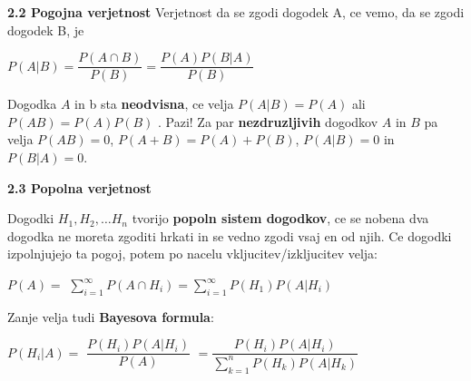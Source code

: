 \documentclass{article}
\begin{document}
\begin{multicols}{3}
\textbf{2.2 Pogojna verjetnost}
Verjetnost da se zgodi dogodek A, ce vemo, da se zgodi dogodek B, je
\begin{center}
    \begin{math}
        P(A | B) = \dfrac{P(A \cap B)}{P(B)} = \dfrac{P(A)P(B|A)}{P(B)}
    \end{math}
\end{center}
Dogodka $A$ in b sta \textbf{neodvisna}, ce velja $P(A | B) = P(A)$ ali
$P(A B) = P(A)P(B)$ .
Pazi! Za par \textbf{nezdruzljivih} dogodkov $A$ in $B$
pa velja $P(AB) = 0$,  $P(A + B) = P(A) + P(B)$, $P(A|B) = 0$ in $P(B|A) = 0$.

\textbf{2.3 Popolna verjetnost}

Dogodki $H_{1}, H_{2}, \dots H_{n}$ tvorijo \textbf{popoln sistem dogodkov},
ce se nobena dva dogodka ne moreta zgoditi hrkati in se vedno
zgodi vsaj en od njih. Ce dogodki izpolnjujejo ta pogoj, potem po
nacelu vkljucitev/izkljucitev velja:
\begin{center}
    \begin{math}
        P(A) =
    \end{math}
    \smallskip
    \begin{math}
        \sum_{i=1}^{\infty} P(A \cap H_{i}) =
        \sum_{i=1}^{\infty} P(H_{1}) P(A | H_{i})
    \end{math}
\end{center}
Zanje velja tudi \textbf{Bayesova formula}:
\begin{center}
    \begin{math}
        P(H_{i} | A) = 
    \end{math}
    \begin{math}
        \dfrac{
            P(H_{i}) P(A | H_{i})
        }
        {
            P(A)
        }
    \end{math}
    \begin{math}
        = \dfrac{
            P(H_{i}) P(A | H_{i})
        }
        {
            \sum_{k=1}^{n} P(H_{k}) P(A | H_{k})
        }
    \end{math}        
\end{center}


\end{multicols}
\end{document}
